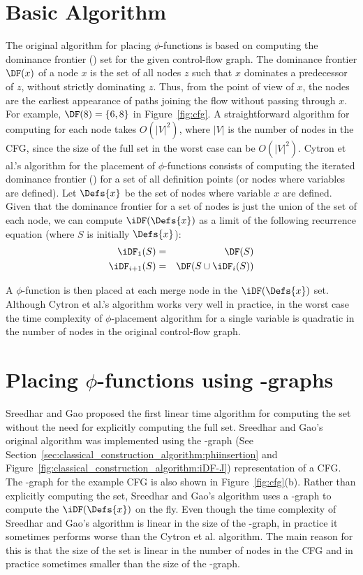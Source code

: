 {\section{Basic Algorithm}
The original algorithm for placing $\phi$-functions
is based on computing the dominance frontier (\DF) set for the given control-flow graph. The dominance frontier $\DF(x)$ of a node $x$ is the set of all nodes 
 $z$ such that $x$ dominates a predecessor of $z$, without strictly dominating $z$. Thus, from the point of view of $x$, the \DF nodes are the earliest appearance of paths joining the flow without passing through $x$.
For example, $\DF(8)= \{ 6, 8 \}$ in Figure~\ref{fig:cfg}. A straightforward algorithm for computing
\DF for each node takes $O(|V|^2)$, where $|V|$ is the number of nodes in the 
CFG, since the size of the full \DF set in the worst case can be $O(|V|^2)$.
Cytron et al.'s algorithm for the placement of $\phi$-functions consists of 
computing the iterated dominance frontier (\iDF) for a set of all definition points (or nodes where
variables are defined). 
Let $\Defs{x}$ be the set of nodes where variable $x$ are  defined.
Given that the dominance frontier for a set of nodes is just the
union of the \DF set of each node, we can compute $\iDF(\Defs{x})$ as a limit of
the following recurrence equation (where $S$ is initially $\Defs{x}$):
\begin{eqnarray*}
\iDF_1(S) &=& \DF(S) \\
\iDF_{i+1} (S) &=& \DF(S \cup \iDF_i(S)) 
\end{eqnarray*}

A $\phi$-function is then placed at each merge node in the  $\iDF(\Defs{x})$ set. 
Although Cytron et al.'s
algorithm works very well in practice, in the worst case the time complexity of $\phi$-placement algorithm for a single variable is quadratic in the number of nodes in the original control-flow graph.


\section{Placing $\phi$-functions using \DJ-graphs}
Sreedhar and Gao proposed the first linear time algorithm for computing the \iDF set without the need for explicitly computing the full \DF set. Sreedhar and Gao's original algorithm was implemented using the \DJ-graph (See Section~\ref{sec:classical_construction_algorithm:phiinsertion} and Figure~\ref{fig:classical_construction_algorithm:iDF-J}) representation of a CFG. 
The \DJ-graph for the example CFG is also shown in Figure~\ref{fig:cfg}(b). Rather than explicitly computing the \DF set, Sreedhar and Gao's algorithm uses a \DJ-graph to compute the  $\iDF(\Defs{x})$ on the fly. Even though the time complexity of Sreedhar and Gao's algorithm is linear in the size of the \DJ-graph, in practice it sometimes performs worse than the Cytron et al. algorithm. The main reason for this is that the size of the \DF set is linear in the number of nodes in the CFG 
and in practice sometimes smaller than the size of the \DJ-graph. 


}
